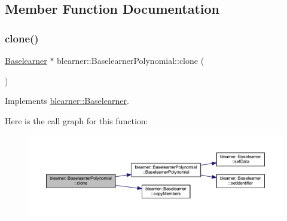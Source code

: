 \subsection{Member Function Documentation}
\mbox{\label{classblearner_1_1_baselearner_polynomial_a4afd811448bd6d387b721cc48b84da26}} 
\subsubsection{\texorpdfstring{clone()}{clone()}}
{\footnotesize\ttfamily \mbox{\hyperlink{classblearner_1_1_baselearner}{Baselearner}} $\ast$ blearner\+::\+Baselearner\+Polynomial\+::clone (\begin{DoxyParamCaption}{ }\end{DoxyParamCaption})\hspace{0.3cm}{\ttfamily [virtual]}}



Implements \mbox{\hyperlink{classblearner_1_1_baselearner_a8e12c6739f085917a7d2da6570c51a21}{blearner\+::\+Baselearner}}.

Here is the call graph for this function\+:\nopagebreak
\begin{figure}[H]
\begin{center}
\leavevmode
\includegraphics[width=350pt]{classblearner_1_1_baselearner_polynomial_a4afd811448bd6d387b721cc48b84da26_cgraph}
\end{center}
\end{figure}
\mbox{\label{classblearner_1_1_baselearner_polynomial_aacd6ba3b09ccf63a96d7bffa1d703710}} 
